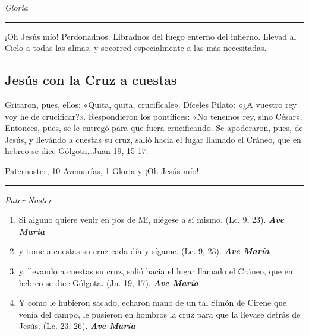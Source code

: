 \documentclass[a4paper,11pt, oneside]{report}
\begin{document}
{{\begin{enumerate}
      \end{enumerate}

      \indent\textit{Gloria} \par      

      \begin{center}\rule{1\linewidth}{\linethickness}\end{center}
      
      \medskip
      \hypertarget{finalCoronacion}{¡Oh Jesús mío! Perdonadnos. Libradnos del fuego enterno del infierno. Llevad al Cielo a todas las almas, y socorred especialmente a las más 
      necesitadas.}
    }

  \subsection*{Jesús con la Cruz a cuestas}
    {
      Gritaron, pues, ellos: «Quita, quita, crucifícale». Díceles Pilato: «¿A vuestro rey voy he de crucificar?». Respondieron los pontífices: «No tenemos rey,
      sino César». Entonces, pues, se le entregó para que fuera crucificando. Se apoderaron, pues, de Jesús, y llevándo a cuestas su cruz, salió hacia el lugar
      llamado el Cráneo, que en hebreo se dice Gólgota\ldots Juan 19, 15-17.

       Paternoster, 10 Avemarías, 1 Gloria y \hyperlink{finalCruz}{¡Oh Jesús mío!}

      \begin{center}\rule{1\linewidth}{\linethickness}\end{center}

      \medskip
      \textit{Pater Noster}

      \begin{enumerate}
        
        \item Si alguno quiere venir en pos de Mí, niégese a sí mismo. (Lc. 9, 23). \textbf{\textit{Ave María}}

        \item y tome a cuestas su cruz cada día y sígame. (Lc. 9, 23). \textbf{\textit{Ave María}}

        \item y, llevando a cuestas su cruz, salió hacia el lugar llamado el Cráneo, que en hebreo se dice Gólgota. (Jn. 19, 17). \textbf{\textit{Ave María}}

        \item Y como le hubieron sacado, echaron mano de un tal Simón de Cirene que venía del campo, le pusieron en hombros la cruz para que la llevase
        detrás de Jesús. (Lc. 23, 26). \textbf{\textit{Ave María}}


\end{enumerate}}}
\end{document}
